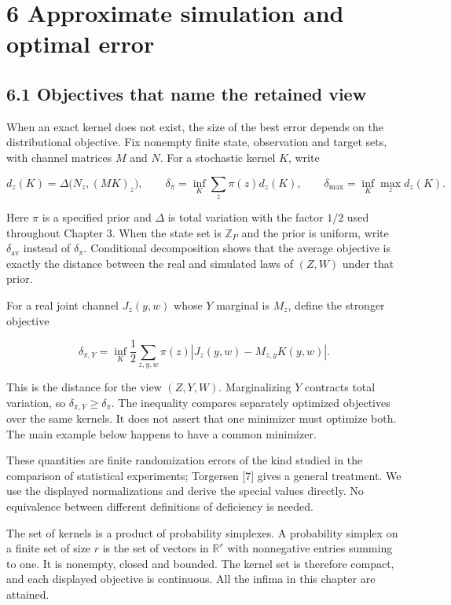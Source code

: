 \documentclass[
]{article}
\begin{document}
\section{6 Approximate simulation and optimal
error}\label{approximate-simulation-and-optimal-error}

\subsection{6.1 Objectives that name the retained
view}\label{objectives-that-name-the-retained-view}

When an exact kernel does not exist, the size of the best error depends
on the distributional objective. Fix nonempty finite state, observation
and target sets, with channel matrices \(M\) and \(N\). For a stochastic
kernel \(K\), write

\[
d_z(K)=\Delta\bigl(N_z,(MK)_z\bigr),
\qquad
\delta_\pi=\inf_K\sum_z\pi(z)d_z(K),
\qquad
\delta_{\max}=\inf_K\max_z d_z(K).
\]

Here \(\pi\) is a specified prior and \(\Delta\) is total variation with
the factor \(1/2\) used throughout Chapter 3. When the state set is
\(\mathbb Z_P\) and the prior is uniform, write \(\delta_{\mathrm{av}}\)
instead of \(\delta_\pi\). Conditional decomposition shows that the
average objective is exactly the distance between the real and simulated
laws of \((Z,W)\) under that prior.

For a real joint channel \(J_z(y,w)\) whose \(Y\) marginal is \(M_z\),
define the stronger objective

\[
\delta_{\pi,Y}=\inf_K\frac12\sum_{z,y,w}\pi(z)
\left|J_z(y,w)-M_{z,y}K(y,w)\right|.
\]

This is the distance for the view \((Z,Y,W)\). Marginalizing \(Y\)
contracts total variation, so \(\delta_{\pi,Y}\ge\delta_\pi\). The
inequality compares separately optimized objectives over the same
kernels. It does not assert that one minimizer must optimize both. The
main example below happens to have a common minimizer.

These quantities are finite randomization errors of the kind studied in
the comparison of statistical experiments; Torgersen {[}7{]} gives a
general treatment. We use the displayed normalizations and derive the
special values directly. No equivalence between different definitions of
deficiency is needed.

The set of kernels is a product of probability simplexes. A probability
simplex on a finite set of size \(r\) is the set of vectors in
\(\mathbb R^r\) with nonnegative entries summing to one. It is nonempty,
closed and bounded. The kernel set is therefore compact, and each
displayed objective is continuous. All the infima in this chapter are
attained.
\end{document}
